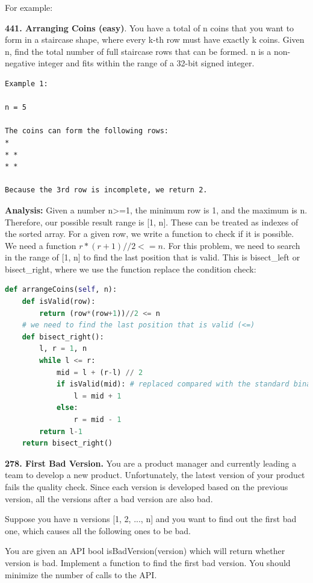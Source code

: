 \documentclass[../searching.tex]{subfiles}
\begin{document}
For example: 
\begin{examples}[resume]
\item \textbf{441. Arranging Coins (easy)}. You have a total of n coins that you want to form in a staircase shape, where every k-th row must have exactly k coins. Given n, find the total number of full staircase rows that can be formed. n is a non-negative integer and fits within the range of a 32-bit signed integer.
\begin{lstlisting}[numbers=none]
Example 1:

n = 5

The coins can form the following rows:
*
* *
* *

Because the 3rd row is incomplete, we return 2.
\end{lstlisting}

\textbf{Analysis: } Given a number n>=1, the minimum row is 1, and the maximum is n. Therefore, our possible result range is [1, n]. These can be treated as indexes of the sorted array. For a given row, we write a function to check if it is possible. We need a function $r* (r+1) // 2 <= n$. For this problem, we need to search in the range of [1, n] to find the last position that is valid. This is bisect\_left or bisect\_right, where we use the function replace the condition check:
\begin{lstlisting}[language=Python]
def arrangeCoins(self, n):
    def isValid(row):
        return (row*(row+1))//2 <= n
    # we need to find the last position that is valid (<=)
    def bisect_right():
        l, r = 1, n
        while l <= r:
            mid = l + (r-l) // 2
            if isValid(mid): # replaced compared with the standard binary search
                l = mid + 1
            else:
                r = mid - 1
        return l-1
    return bisect_right()
\end{lstlisting}
\item \textbf{278. First Bad Version.} You are a product manager and currently leading a team to develop a new product. Unfortunately, the latest version of your product fails the quality check. Since each version is developed based on the previous version, all the versions after a bad version are also bad.

Suppose you have n versions [1, 2, ..., n] and you want to find out the first bad one, which causes all the following ones to be bad.

You are given an API bool isBadVersion(version) which will return whether version is bad. Implement a function to find the first bad version. You should minimize the number of calls to the API.


\end{examples}
\end{document}
